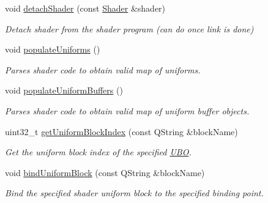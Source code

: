 \begin{Indent}
\begin{DoxyCompactItemize}
\mbox{\label{classrev_1_1_shader_program_a8305b76cf9bd54bfc99813aac95e18e2}} 
void \mbox{\hyperlink{classrev_1_1_shader_program_a8305b76cf9bd54bfc99813aac95e18e2}{detach\+Shader}} (const \mbox{\hyperlink{classrev_1_1_shader}{Shader}} \&shader)
\begin{DoxyCompactList}\small\item\em Detach shader from the shader program (can do once link is done) \end{DoxyCompactList}\item 
\mbox{\label{classrev_1_1_shader_program_a5c0ffcb817cdc2c2f14c94cc85b0913d}} 
void \mbox{\hyperlink{classrev_1_1_shader_program_a5c0ffcb817cdc2c2f14c94cc85b0913d}{populate\+Uniforms}} ()
\begin{DoxyCompactList}\small\item\em Parses shader code to obtain valid map of uniforms. \end{DoxyCompactList}\item 
\mbox{\label{classrev_1_1_shader_program_a926e54a9c78ded30f5b657ed730158c8}} 
void \mbox{\hyperlink{classrev_1_1_shader_program_a926e54a9c78ded30f5b657ed730158c8}{populate\+Uniform\+Buffers}} ()
\begin{DoxyCompactList}\small\item\em Parses shader code to obtain valid map of uniform buffer objects. \end{DoxyCompactList}\item 
uint32\+\_\+t \mbox{\hyperlink{classrev_1_1_shader_program_a9d5620c172452745135a331b901a25f6}{get\+Uniform\+Block\+Index}} (const Q\+String \&block\+Name)
\begin{DoxyCompactList}\small\item\em Get the uniform block index of the specified \mbox{\hyperlink{classrev_1_1_u_b_o}{U\+BO}}. \end{DoxyCompactList}\item 
void \mbox{\hyperlink{classrev_1_1_shader_program_a4c0b3cf05a3c12e8314fe4c6c11fd0b9}{bind\+Uniform\+Block}} (const Q\+String \&block\+Name)
\begin{DoxyCompactList}\small\item\em Bind the specified shader uniform block to the specified binding point. \end{DoxyCompactList}\item 

\end{DoxyCompactItemize}
\end{Indent}
